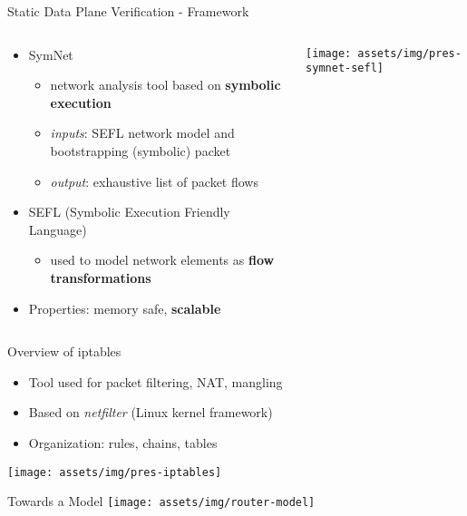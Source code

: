 \documentclass{beamer}
\begin{document}
\begin{frame}[t]{Static Data Plane Verification - Framework}
  \begin{columns}
    \begin{column}{.6\textwidth}
      \begin{itemize}
        \item SymNet
          \begin{itemize}
            \item network analysis tool based on \textbf{symbolic execution}
            \item \emph{inputs}: SEFL network model and bootstrapping
              (symbolic) packet
            \item \emph{output}: exhaustive list of packet flows
          \end{itemize}
        \item SEFL (Symbolic Execution Friendly Language)
          \begin{itemize}
            \item used to model network elements as \textbf{flow
              transformations}
          \end{itemize}
        \item Properties: memory safe, \textbf{scalable}
      \end{itemize}
    \end{column}

    \begin{column}{.4\textwidth}
      \centering
      \texttt{[image: assets/img/pres-symnet-sefl]}
    \end{column}
  \end{columns}
\end{frame}

\begin{frame}{Overview of iptables}
  \begin{itemize}
    \item Tool used for packet filtering, NAT, mangling
    \item Based on \emph{netfilter} (Linux kernel framework)
    \item Organization: rules, chains, tables
  \end{itemize}

  \centering
  \texttt{[image: assets/img/pres-iptables]}
\end{frame}

\begin{frame}{Towards a Model}
  \centering
  \texttt{[image: assets/img/router-model]}
\end{frame}
\end{document}

